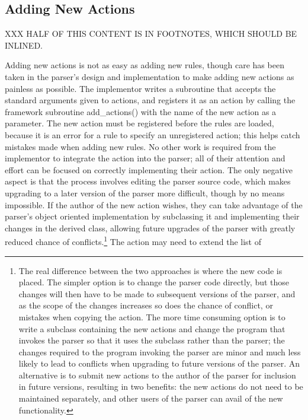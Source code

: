 \subsection{Adding New Actions}

\label{adding new actions in implementation}

XXX HALF OF THIS CONTENT IS IN FOOTNOTES, WHICH SHOULD BE INLINED\@.

Adding new actions is not as easy as adding new rules, though care has been
taken in the parser's design and implementation to make adding new actions
as painless as possible.  The implementor writes a subroutine that accepts
the standard arguments given to actions, and registers it as an action by
calling the framework subroutine add\_actions() with the name of the new
action as a parameter.  The new action must be registered before the rules
are loaded, because it is an error for a rule to specify an unregistered
action; this helps catch mistakes made when adding new rules.  No other
work is required from the implementor to integrate the action into the
parser; all of their attention and effort can be focused on correctly
implementing their action.  The only negative aspect is that the process
involves editing the parser source code, which makes upgrading to a later
version of the parser more difficult, though by no means impossible.  If
the author of the new action wishes, they can take advantage of the
parser's object oriented implementation by subclassing it and implementing
their changes in the derived class, allowing future upgrades of the parser
with greatly reduced chance of conflicts.\footnote{The real difference
between the two approaches is where the new code is placed.  The simpler
option is to change the parser code directly, but those changes will then
have to be made to subsequent versions of the parser, and as the scope of
the changes increases so does the chance of conflict, or mistakes when
copying the action.  The more time consuming option is to write a subclass
containing the new actions and change the program that invokes the parser
so that it uses the subclass rather than the parser; the changes required
to the program invoking the parser are minor and much less likely to lead
to conflicts when upgrading to future versions of the parser.  An
alternative is to submit new actions to the author of the parser for
inclusion in future versions, resulting in two benefits: the new actions do
not need to be maintained separately, and other users of the parser can
avail of the new functionality.} The action may need to extend the list of
